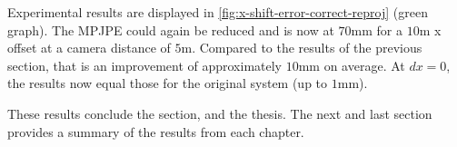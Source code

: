 Experimental results are displayed in \autoref{fig:x-shift-error-correct-reproj} (green graph).
The MPJPE could again be reduced and is now at $70$mm for a $10$m x offset at a camera distance of $5$m.
Compared to the results of the previous section, that is an improvement of approximately $10$mm on average.
At $dx = 0$, the results now equal those for the original system (up to $1$mm).


These results conclude the section, and the thesis.
The next and last section provides a summary of the results from each chapter.
